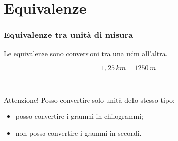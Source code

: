 \documentclass[handout]{beamer}
\theoremstyle{plain}
\begin{document}
\section{Equivalenze}



\begin{frame}
\frametitle{Equivalenze tra unità di misura}
Le equivalenze sono \alert{conversioni tra una udm all'altra}.

\[ 1,25 \, km = 1250 \, m \]\pause

~

Attenzione! Posso convertire solo unità \alert{dello stesso tipo}:\pause

\begin{itemize}
  \item posso convertire i grammi in chilogrammi;\pause
  \item \alert{non} posso convertire i grammi in secondi.
\end{itemize}
\end{frame}
\end{document}
